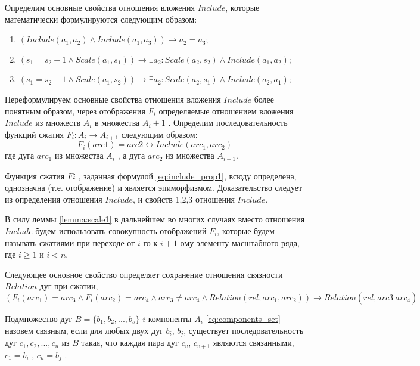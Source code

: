 Определим основные свойства отношения вложения  $Include$,  которые математически формулируются следующим образом:
\begin{enumerate}
\item $(Include ( a_1, a_2) \wedge  Include ( a_1, a_3) ) \to a_2 = a_3$; %
\item $( s_1  = s_2 - 1 \wedge  Scale(a_1, s_1)) \to \exists a_2 : Scale(a_2, s_2) \wedge Include(a_1, a_2)$; %
\item $(s_1  = s_2 - 1 \wedge Scale(a_1, s_2)) \to \exists a_2: Scale(a_2, s_1)\wedge Include(a_2, a_1)$; %
\end{enumerate}
Переформулируем  основные свойства отношения вложения $Include$  более понятным образом, через отображения  $F_i$  определяемые отношением вложения  $Include$  из  множеств  $A_i$ в множества $A_i+1$ .     
Определим последовательность функций сжатия  $F_i : A_i \to A_{i+1}$ следующим образом: 
\begin{equation}
F_i(arc1) = arc2 \leftrightarrow Include ( arc_1, arc_2 )
\label{eq:include_prop1}
\end{equation}
где  дуга  $arc_1$  из множества $A_i$  , а  дуга  $arc_2$  из множества $A_{i+1}$.

\begin{lemma}
Функция сжатия  $Fi$ , заданная формулой \ref{eq:include_prop1},   всюду определена, однозначна (т.е. отображение)  и   является эпиморфизмом.
Доказательство следует из определения отношения $Include$,  и свойств 1,2,3 отношения $Include$.
\label{lemma:scale1}
\end{lemma}


\begin{remark}
В силу леммы \ref{lemma:scale1}  в дальнейшем во многих случаях вместо отношения $Include$  будем использовать совокупность отображений  $F_i$, которые будем называть сжатиями при переходе от  $i$-го  к $i+1$-ому  элементу масштабного ряда, где  $i \geq 1$ и  $i < n$.
\end{remark}

Следующее основное свойство определяет сохранение отношения связности $Relation$ дуг при сжатии, $$(F_i (arc_1) = arc_3\wedge F_i (arc_2) = arc_4 \wedge arc_3 \neq  arc_4   \wedge  Relation(rel, arc_1, arc_2)) \to Relation(rel, arc3_, arc_4)$$

\begin{definition}
Подмножество дуг $B = \{b_1, b_2, ..., b_s\}$  $i$  компоненты $A_i$ \ref{eq:components_set} назовем  связным, если для любых двух дуг $b_i$, $b_j$, существует последовательность дуг $c_1, c_2, ..., c_u$  из   $B$ такая, что  каждая пара дуг $c_v$, $c_{v+1}$ являются связанными,  $c_1 = b_i$ , $c_u = b_j$ .
\end{definition}

